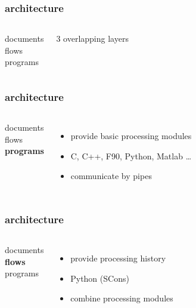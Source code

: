 \begin{frame} \frametitle{\mg architecture}

  \begin{columns}
    documents \\
    \vspace{0.25in}
    flows \\
    \vspace{0.25in}
    programs
    
    $3$ overlapping layers
    
  \end{columns}
  
\end{frame}
\cwpnote{}

\begin{frame} \frametitle{\mg architecture}

  \begin{columns}
    documents \\
    \vspace{0.25in}
    flows \\
    \vspace{0.25in}
    \textbf{programs}
    
    \begin{itemize}
    \item provide basic processing modules
    \item C, C++, F90, Python, Matlab \dots
    \item communicate by pipes
    \end{itemize}
    
  \end{columns}
  
\end{frame}
\cwpnote{}

\begin{frame} \frametitle{\mg architecture}

  \begin{columns}
    documents \\
    \vspace{0.25in}
    \textbf{flows} \\
    \vspace{0.25in}
    programs
    
    \begin{itemize}
    \item provide processing history
    \item Python (SCons)
    \item combine processing modules
    \end{itemize}
    
  \end{columns}
  
\end{frame}
\cwpnote{}

